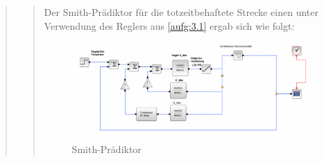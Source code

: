 \begin{quote}
    
    \begin{quote}
        
        Der Smith-Prädiktor für die totzeitbehaftete Strecke einen unter Verwendung des Reglers aus \ref{aufg:3.1} ergab sich wie folgt:
        
       \begin{figure}[H]
        \centering
            \includegraphics[scale=0.4, trim = 0cm 0cm 0cm 0cm, clip]{./Bilder/Smith-Praediktor}
                \caption{Smith-Prädiktor}
        \end{figure}
    
        
    \end{quote}
    
\end{quote} %



